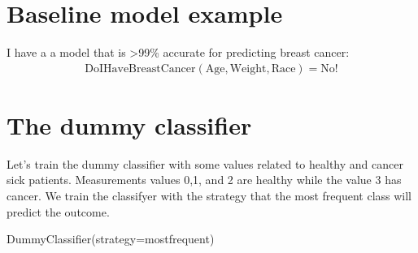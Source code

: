 \documentclass[letterpaper,10pt,english]{sphinxmanual}
\begin{document}
\section{Baseline model example}
\label{\detokenize{03-Datasets:baseline-model-example}}
\sphinxAtStartPar
I have a a model that is \textgreater{}99\% accurate for predicting breast cancer:
\begin{equation*}
\begin{split} \textrm{DoIHaveBreastCancer}(\textrm{Age}, \textrm{Weight}, \textrm{Race}) = \textrm{No!} \end{split}
\end{equation*}



\section{The dummy classifier}
\label{\detokenize{03-Datasets:the-dummy-classifier}}
\sphinxAtStartPar
Let’s train the dummy classifier with some values related to healthy and cancer sick patients. Measurements values 0,1, and 2 are healthy while the value 3 has cancer. We train the classifyer with the strategy that the most frequent class will predict the outcome.

\begin{sphinxVerbatim}[commandchars=\\\{\}]
   

  

\PYG{p}{[}   \PYG{p}{]} 
       \PYG{p}{[}   \PYG{p}{]}
\end{sphinxVerbatim}

\begin{sphinxVerbatim}[commandchars=\\\{\}]
DummyClassifier(strategy=\PYGZsq{}most\PYGZus{}frequent\PYGZsq{})
\end{sphinxVerbatim}
\end{document}
